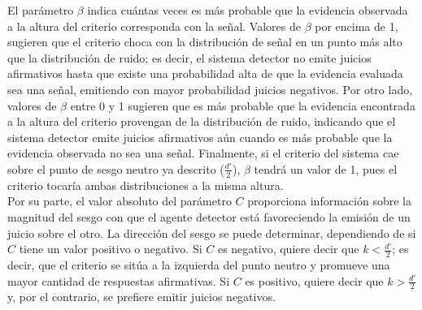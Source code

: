 \begin{itemize}
El parámetro $\beta$ indica cuántas veces es más probable que la evidencia observada a la altura del criterio corresponda con la señal. Valores de $\beta$ por encima de 1, sugieren que el criterio choca con la distribución de señal en un punto más alto que la distribución de ruido; es decir, el sistema detector no emite juicios afirmativos hasta que existe una probabilidad alta de que la evidencia evaluada sea una señal, emitiendo con mayor probabilidad juicios negativos. Por otro lado, valores de $\beta$ entre 0 y 1 sugieren que es más probable que la evidencia encontrada a la altura del criterio provengan de la distribución de ruido, indicando que el sistema detector emite juicios afirmativos aún cuando es más probable que la evidencia observada no sea una señal. Finalmente, si el criterio del sistema cae sobre el punto de sesgo neutro ya descrito ($\frac{d'}{2}$), $\beta$ tendrá un valor de 1, pues el criterio tocaría ambas distribuciones a la misma altura.\\

Por su parte, el valor absoluto del parámetro $C$ proporciona información sobre la magnitud del sesgo con que el agente detector está favoreciendo la emisión de un juicio sobre el otro. La dirección del sesgo se puede determinar, dependiendo de si $C$ tiene un valor positivo o negativo. Si $C$ es negativo, quiere decir que $k < \frac{d'}{2}$; es decir, que el criterio se sitúa a la izquierda del punto neutro y promueve una mayor cantidad de respuestas afirmativas. Si $C$ es positivo, quiere decir que $k > \frac{d'}{2}$ y, por el contrario, se prefiere emitir juicios negativos.\\


\end{itemize}
